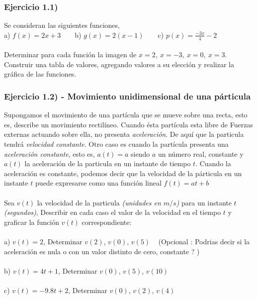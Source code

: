 \documentclass[11pt, a4paper]{article}
\begin{document}
\subsubsection*{ Ejercicio 1.1) } 
Se consideran las siguientes funciones, \\
a) $ f(x) = 2x + 3 $ ~ ~ b) $\displaystyle  g(x) = 2(x-1) $ ~ ~ c) $\displaystyle p(x) = \frac{-3x}{4} - 2 $ \\ \\
Determinar para cada funci\'on la imagen de $x=2,~x=-3,~ x=0,~x=3$. \\ Construir una tabla de valores, agregando valores a su elecci\'on y realizar la gr\'afica de las funciones. 
\subsubsection*{ Ejercicio 1.2) - Movimiento unidimensional de una p\'articula}
Supongamos el movimiento de una part\'icula que se mueve sobre una recta, esto es, describe un movimiento rectil\'ineo. Cuando \'esta part\'icula esta libre de Fuerzas externas actuando sobre ella, no presenta \textit{aceleraci\'on}. De aqu\'i que la particula tendr\'a \textit{velocidad constante}. Otro caso es cuando la part\'icula presenta una \textit{aceleraci\'on constante}, esto es, $a(t) = a$ siendo $a$ un n\'umero real, constante y $a(t)$ la aceleraci\'on de la particula en un instante de tiempo $t$. Cuando la aceleraci\'on es constante, podemos decir que la velocidad de la p\'articula en un instante $t$ puede expresarse como una funci\'on lineal $f(t) = at + b$ \\ \\ 
Sea $v(t)$ la velocidad de la particula \textit{(unidades en $m/s$)} para un instante $t$ \textit{(segundos)}, Describir en cada caso el valor de la velocidad en el tiempo $t$ y graficar la funci\'on $v(t)$ correspondiente: \\ \\ 
a) $v(t) = 2 $,  Determinar $v(2)$, $v(0)$, $v(5)$ ~ (Opcional : Podrias decir si la aceleraci\'on es nula o con un valor distinto de cero, constante ? )  \\ \\ 
b) $v(t) = 4t + 1$, Determinar $v(0)$, $v(5)$, $v(10)$ \\ \\ 
c) $v(t) = -9.8t + 2$, Determinar $v(0)$, $v(2)$, $v(4)$ \\ \\ 

 
\end{document}

